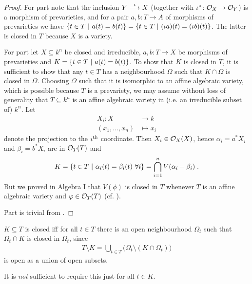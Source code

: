 \documentclass[a4paper,parskip=half,numbers=enddot, DIV=12]{scrreprt}
\begin{document}
\begin{proof}
		For part  note that the inclusion $Y\morphism[\iota] X$ (together with $\iota^*\colon \mathcal{O}_X\to\mathcal{O}_Y$) is a morphism of prevarieties, and for a pair $a,b\colon T\to A$ of morphisms of prevarieties we have $\left\{t\in T\ \middle|\  a(t) = b(t) \right\} = \left\{t \in T\ \middle|\ (\iota a)(t) = (\iota b)(t) \right\}$. The latter is closed in $T$ because $X$ is a variety.
	
        For part  let $X\subseteq k^n$ be closed and irreducible, $a,b\colon T\to X$ be morphisms of prevarieties and $K= \left\{t\in T\ \middle|\  a(t) = b(t)\right\}$. To show that $K$ is closed in $T$, it is sufficient to show that any $t\in T$ has a neighbourhood $\Omega$ such that $K\cap \Omega$ is closed in $\Omega$. Choosing $\Omega$ such that it is isomorphic to an affine algebraic variety, which is possible because $T$ is a prevariety, we may assume without loss of generality that $T\subseteq k^n$ is an affine algebraic variety in (i.e.  an irreducible subset of) $k^n$. Let 
	        \begin{align*}
		    X_i\colon X&\longrightarrow k\\
		    (x_1,\ldots,x_n)&\longmapsto x_i
		\end{align*}
		denote the projection to the $i^{\text{th}}$ coordinate. Then $X_i\in\mathcal{O}_X(X)$, hence $\alpha_i = a^\ast X_i$ and $\beta_i = b^\ast X_i$ are in $\mathcal{O}_T(T)$ and 
		\begin{align}
		    K= \left\{ t\in T\ \middle|\  \alpha_i(t) = \beta_i(t)\ \forall i\right\} = \bigcap_{i=1}^n V(\alpha_i-\beta_i)\;.
		\end{align}
		But we proved in Algebra I that $V(\phi)$ is closed in $T$ whenever $T$ is an affine algebraic variety and $\varphi\in  \mathcal{O}_T(T)$ (cf. \cite[Proposition 2.2.1]{alg1}).
		
		Part  is trivial from .	
\end{proof}
\begin{rem*}
    \begin{alphanumerate}
    \item 
        $K\subseteq T$ is closed iff for all $t\in T$ there is an open neighbourhood $\Omega_t$ such that $\Omega_t\cap K$ is closed in $\Omega_t$, since 
        \begin{align*}
            T\setminus K = \bigcup_{t\in T} \big(\Omega_t\setminus (K\cap \Omega_t)\big)
        \end{align*}
        is open as a union of open subsets.
    \item
        It is \emph{not} sufficient to require this just for all $t\in K$.
    \end{alphanumerate}
\end{rem*}
\end{document}
